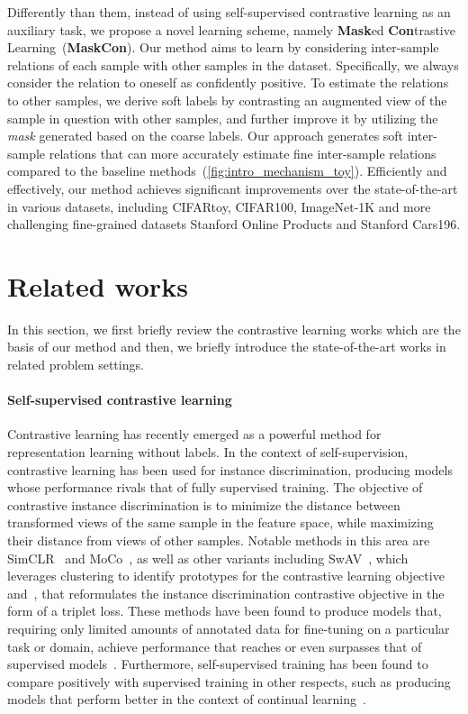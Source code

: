 \documentclass[10pt,twocolumn,letterpaper]{article}
\begin{document}
Differently than them, instead of using self-supervised contrastive learning as an auxiliary task, we propose a novel learning scheme, namely \textbf{Mask}ed \textbf{Con}trastive Learning~(\textbf{MaskCon}).  Our method aims to learn by considering inter-sample relations of each sample with other samples in the dataset. Specifically, we always consider the relation to oneself as confidently positive. To estimate the relations to other samples, we derive soft labels by contrasting an augmented view of the sample in question with other samples, and further improve it by utilizing the \textit{mask} generated based on the coarse labels.
Our approach generates soft inter-sample relations that can more accurately estimate fine inter-sample relations compared to the baseline methods~(\cref{fig:intro_mechanism_toy}). Efficiently and effectively, our method achieves significant improvements over the state-of-the-art in various datasets, including CIFARtoy, CIFAR100, ImageNet-1K and more challenging fine-grained datasets Stanford Online Products and Stanford Cars196. 

\section{Related works}
In this section, we first briefly review the contrastive learning works which are the basis of our method and then, we briefly introduce the state-of-the-art works in related problem settings. 



\paragraph{Self-supervised contrastive learning}
\label{sec:contrastive_learning_rw}
Contrastive learning has recently emerged as a powerful method for representation learning without labels. In the context of self-supervision, contrastive learning has been used for instance discrimination, producing models whose performance rivals that of fully supervised training. The objective of contrastive instance discrimination is to minimize the distance between transformed views of the same sample in the feature space, while maximizing their distance from views of other samples. Notable methods in this area are SimCLR~\cite{simclr} and MoCo~\cite{moco}, as well as other variants including SwAV~\cite{swav}, which leverages clustering to identify prototypes for the contrastive learning objective and~\cite{wang2021solving}, that reformulates the instance discrimination contrastive objective in the form of a triplet loss. These methods have been found to produce models that, requiring only limited amounts of annotated data for fine-tuning on a particular task or domain, achieve performance that reaches or even surpasses that of supervised models~\cite{simclrv2, ericsson2021well}. Furthermore, self-supervised training has been found to compare positively with supervised training in other respects, such as producing models that perform better in the context of continual learning~\cite{gallardo2021self}.
\end{document}
